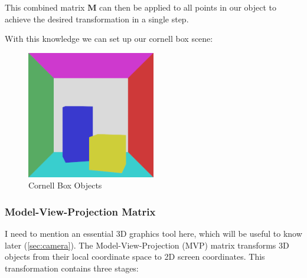 \documentclass[12pt]{article}
\begin{document}
This combined matrix $\mathbf{M}$ can then be applied to all points in our object to achieve the desired transformation in a single step.

With this knowledge we can set up our cornell box scene:
\begin{figure}[H]
    \centering
    \includegraphics[width=0.5\textwidth]{images/artsy_rep/no_lighting_cornell.png}
    \caption{Cornell Box Objects}
    \label{fig:unlitcornell}
\end{figure}

\subsubsection{Model-View-Projection Matrix}
I need to mention an essential 3D graphics tool here, which will be useful to know later (\ref{sec:camera}). The Model-View-Projection (MVP) matrix transforms 3D objects from their local coordinate space to 2D screen coordinates. This transformation contains three stages:
\end{document}
